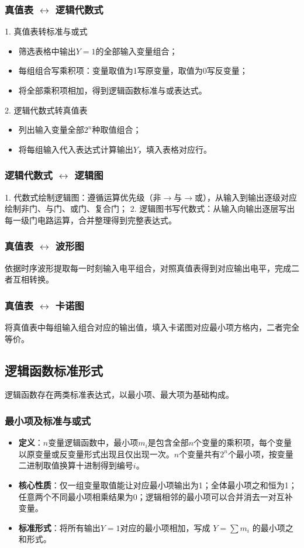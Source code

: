 \subsubsection{真值表 $\leftrightarrow$ 逻辑代数式}
1. 真值表转标准与或式
\begin{itemize}
    \item 筛选表格中输出$Y=1$的全部输入变量组合；
    \item 每组组合写乘积项：变量取值为1写原变量，取值为0写反变量；
    \item 将全部乘积项相加，得到逻辑函数标准与或表达式。
\end{itemize}
2. 逻辑代数式转真值表
\begin{itemize}
    \item 列出输入变量全部$2^n$种取值组合；
    \item 将每组输入代入表达式计算输出$Y$，填入表格对应行。
\end{itemize}

\subsubsection{逻辑代数式 $\leftrightarrow$ 逻辑图}
1. 代数式绘制逻辑图：遵循运算优先级（非$\to$与$\to$或），从输入到输出逐级对应绘制非门、与门、或门、复合门；
2. 逻辑图书写代数式：从输入向输出逐层写出每一级门电路运算，合并整理得到完整表达式。

\subsubsection{真值表 $\leftrightarrow$ 波形图}
依据时序波形提取每一时刻输入电平组合，对照真值表得到对应输出电平，完成二者互相转换。

\subsubsection{真值表 $\leftrightarrow$ 卡诺图}
将真值表中每组输入组合对应的输出值，填入卡诺图对应最小项方格内，二者完全等价。

\subsection{逻辑函数标准形式}
逻辑函数存在两类标准表达式，以最小项、最大项为基础构成。
\subsubsection{最小项及标准与或式}
\begin{itemize}
    \item \textbf{定义}：$n$变量逻辑函数中，最小项$m_i$是包含全部$n$个变量的乘积项，每个变量以原变量或反变量形式出现且仅出现一次。$n$个变量共有$2^n$个最小项，按变量二进制取值换算十进制得到编号$i$。
    \item \textbf{核心性质}：仅一组变量取值能让对应最小项输出为1；全体最小项之和恒为1；任意两个不同最小项相乘结果为0；逻辑相邻的最小项可以合并消去一对互补变量。
    \item \textbf{标准形式}：将所有输出$Y=1$对应的最小项相加，写成 $Y=\sum m_i$ 的最小项之和形式。
\end{itemize}

